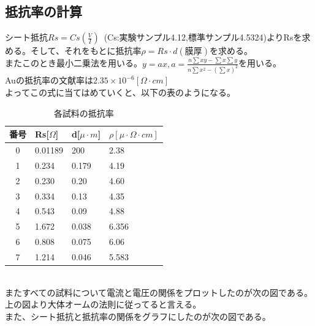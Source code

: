 \documentclass{jsarticle}
\begin{document}
\subsection{抵抗率の計算}
$シート抵抗Rs=Cs(\frac{V}{I})$\ (Cs:実験サンプル4.12,標準サンプル4.5324)よりRsを求める。そして、それをもとに$抵抗率\rho=Rs\cdot d(膜厚)$を求める。\\
またこのとき最小二乗法を用いる。$y=ax, a=\frac{n\sum{xy}-\sum{x}\sum{y}}{n\sum{x^2}-(\sum{x})^2}$を用いる。\\
Auの抵抗率の文献率は$2.35\times10^{-6}[\Omega\cdot cm]$\\
よってこの式に当てはめていくと、以下の表のようになる。\\
\begin{table}[h]
\caption{各試料の抵抗率}
 \label{table:SpeedOfLight}
 \centering
  \begin{tabular}{clll}
   \hline
   番号 & Rs[$\Omega$] & d[$\mu\cdot m$] & $\rho[\mu\cdot\Omega\cdot cm]$ \\
   \hline \hline
    0 & 0.01189 & 200 & 2.38 \\
    1 & 0.234 & 0.179 & 4.19\\
    2 & 0.230 & 0.20 & 4.60\\
    3 & 0.334 & 0.13 & 4.35\\
    4 & 0.543 & 0.09 & 4.88\\
    5 & 1.672 & 0.038 & 6.356\\
    6 & 0.808 & 0.075 & 6.06\\
    7 & 1.214 & 0.046 & 5.583\\
   \hline
  \end{tabular}
\end{table}
\\
またすべての試料について電流と電圧の関係をプロットしたのが次の図である。\\
上の図より大体オームの法則に従ってると言える。\\
また、シート抵抗と抵抗率の関係をグラフにしたのが次の図である。
\\
\end{document}
